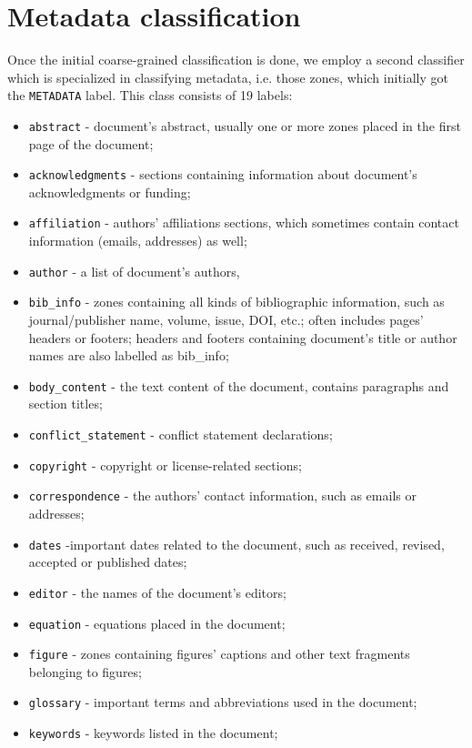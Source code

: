 \section{Metadata classification}
Once the initial coarse-grained classification is done, we employ a second classifier which is specialized in classifying metadata, i.e. those zones, which initially got the \verb+METADATA+ label. This class consists of 19 labels:
\begin{itemize}
    \item \verb+abstract+ - document's abstract, usually one or more zones placed in the first page of the document;
    \item \verb+acknowledgments+ - sections containing information about document's acknowledgments or funding;
    \item \verb+affiliation+ - authors' affiliations sections, which sometimes contain contact information (emails, addresses) as well;
    \item \verb+author+ - a list of document's authors,
    \item \verb+bib_info+ - zones containing all kinds of bibliographic information, such as journal/publisher name, volume, issue, DOI, etc.; often includes pages' headers or footers; headers and footers containing document's title or author names are also labelled as bib\_info;
    \item \verb+body_content+ - the text content of the document, contains paragraphs and section titles;
    \item \verb+conflict_statement+ - conflict statement declarations;
    \item \verb+copyright+ - copyright or license-related sections;
    \item \verb+correspondence+ - the authors' contact information, such as emails or addresses;
    \item \verb+dates+ -important dates related to the document, such as received, revised, accepted or published dates;
    \item \verb+editor+ - the names of the document's editors;
    \item \verb+equation+ - equations placed in the document;
    \item \verb+figure+ - zones containing figures' captions and other text fragments belonging to figures;
    \item \verb+glossary+ - important terms and abbreviations used in the document;
    \item \verb+keywords+ - keywords listed in the document;

\end{itemize}
